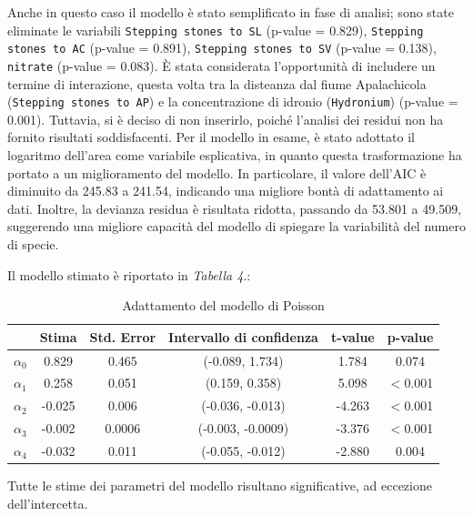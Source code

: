 \documentclass{article} %
\begin{document}
Anche in questo caso il modello è stato semplificato in fase di analisi; sono state eliminate le variabili \texttt{Stepping stones to SL} (p-value = 0.829), \texttt{Stepping stones to AC} (p-value = 0.891), \texttt{Stepping stones to SV} (p-value = 0.138), \texttt{nitrate} (p-value = 0.083).  
È stata considerata l'opportunità di includere un termine di interazione, questa volta tra la disteanza dal fiume Apalachicola (\texttt{Stepping stones to AP}) e la concentrazione di idronio (\texttt{Hydronium}) (p-value = 0.001). Tuttavia, si è deciso di non inserirlo, poiché l'analisi dei residui non ha fornito risultati soddisfacenti.
Per il modello in esame, è stato adottato il logaritmo dell'area come variabile esplicativa, in quanto questa trasformazione ha portato a un miglioramento del modello. In particolare, il valore dell'AIC è diminuito da 245.83 a 241.54, indicando una migliore bontà di adattamento ai dati. Inoltre, la devianza residua è risultata ridotta, passando da 53.801 a 49.509, suggerendo una migliore capacità del modello di spiegare la variabilità del numero di specie.

Il modello stimato è riportato in \textit{Tabella 4}.:
\begin{table}[H]
    \centering
    \renewcommand{\arraystretch}{1.4} %
    \begin{tabular}{lccccc}
        \toprule
        &  Stima &  Std. Error &  Intervallo di confidenza & t-value &  p-value \\
        \midrule  
            $\alpha_0$  & 0.829  & 0.465  & (-0.089, 1.734) & 1.784 & 0.074  \\
            $\alpha_1$     & 0.258  & 0.051  & (0.159, 0.358) & 5.098 & $<$0.001 \\
            $\alpha_2$          & -0.025 & 0.006  & (-0.036, -0.013) &-4.263 & $<$0.001 \\
            $\alpha_3$          & -0.002 & 0.0006  & (-0.003, -0.0009) & -3.376 & $<$0.001 \\
            $\alpha_4$          & -0.032 & 0.011  & (-0.055, -0.012) & -2.880 & 0.004 \\
        \bottomrule
    \end{tabular}
    \caption{Adattamento del modello di Poisson}
\end{table}

Tutte le stime dei parametri del modello risultano significative, ad eccezione dell'intercetta.
\end{document}
